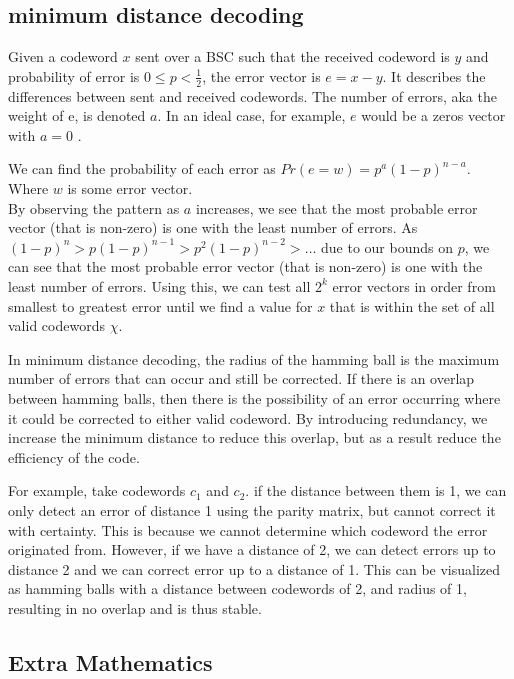 \subsection{minimum distance decoding}

Given a codeword $x$ sent over a BSC such that the received codeword is $y$ and probability of error is $0 \le p < \frac{1}{2}$, the error vector is $e = x-y$. It describes the differences between sent and received codewords. The number of errors, aka the weight of e, is denoted $a$. In an ideal case, for example, $e$ would be a zeros vector with $a = 0$ . 

We can find the probability of each error as $Pr(e = w) = p^a(1-p)^{n-a}$. Where $w$ is some error vector.\\

By observing the pattern as $a$ increases, we see that the most probable error vector (that is non-zero) is one with the least number of errors.
As $(1-p)^n > p(1-p)^{n-1} > p^2(1-p)^{n-2} > \dots$ due to our bounds on $p$, we can see that the most probable error vector (that is non-zero) is one with the least number of errors. Using this, we can test all $2^k$ error vectors in order from smallest to greatest error until we find a value for $x$ that is within the set of all valid codewords $\chi$.

In minimum distance decoding, the radius of the hamming ball is the maximum number of errors that can occur and still be corrected. If there is an overlap between hamming balls, then there is the possibility of an error occurring where it could be corrected to either valid codeword. By introducing redundancy, we increase the minimum distance to reduce this overlap, but as a result reduce the efficiency of the code.


For example, take codewords $c_1$ and $c_2$. if the distance between them is 1, we can only detect an error of distance 1 using the parity matrix, but cannot correct it with certainty. This is because we cannot determine which codeword the error originated from. However, if we have a distance of 2, we can detect errors up to distance 2 and we can correct error up to a distance of 1. This can be visualized as hamming balls with a distance between codewords of 2, and radius of 1, resulting in no overlap and is thus stable.

\subsection{Extra Mathematics}

